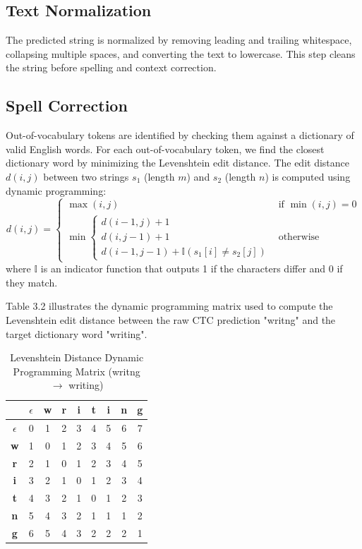 \subsection{Text Normalization}
The predicted string is normalized by removing leading and trailing whitespace, collapsing multiple spaces, and converting the text to lowercase. This step cleans the string before spelling and context correction.

\subsection{Spell Correction}
Out-of-vocabulary tokens are identified by checking them against a dictionary of valid English words. For each out-of-vocabulary token, we find the closest dictionary word by minimizing the Levenshtein edit distance. The edit distance $d(i, j)$ between two strings $s_1$ (length $m$) and $s_2$ (length $n$) is computed using dynamic programming:
\begin{equation}
    d(i, j) = \begin{cases}
        \max(i, j) & \text{if } \min(i, j) = 0 \\
        \min \begin{cases}
            d(i-1, j) + 1 \\
            d(i, j-1) + 1 \\
            d(i-1, j-1) + \mathbb{I}(s_1[i] \neq s_2[j])
        \end{cases} & \text{otherwise}
    \end{cases}
\end{equation}
where $\mathbb{I}$ is an indicator function that outputs 1 if the characters differ and 0 if they match. 

Table 3.2 illustrates the dynamic programming matrix used to compute the Levenshtein edit distance between the raw CTC prediction "writng" and the target dictionary word "writing".

\begin{table}[h!]
\centering
\caption{Levenshtein Distance Dynamic Programming Matrix (writng $\to$ writing)}
\label{tab:levenshtein}
\begin{tabular}{ccccccccc}
    \toprule
    & $\epsilon$ & \textbf{w} & \textbf{r} & \textbf{i} & \textbf{t} & \textbf{i} & \textbf{n} & \textbf{g} \\
    \midrule
    $\epsilon$ & 0 & 1 & 2 & 3 & 4 & 5 & 6 & 7 \\
    \textbf{w} & 1 & 0 & 1 & 2 & 3 & 4 & 5 & 6 \\
    \textbf{r} & 2 & 1 & 0 & 1 & 2 & 3 & 4 & 5 \\
    \textbf{i} & 3 & 2 & 1 & 0 & 1 & 2 & 3 & 4 \\
    \textbf{t} & 4 & 3 & 2 & 1 & 0 & 1 & 2 & 3 \\
    \textbf{n} & 5 & 4 & 3 & 2 & 1 & 1 & 1 & 2 \\
    \textbf{g} & 6 & 5 & 4 & 3 & 2 & 2 & 2 & 1 \\
    \bottomrule
\end{tabular}
\end{table}

